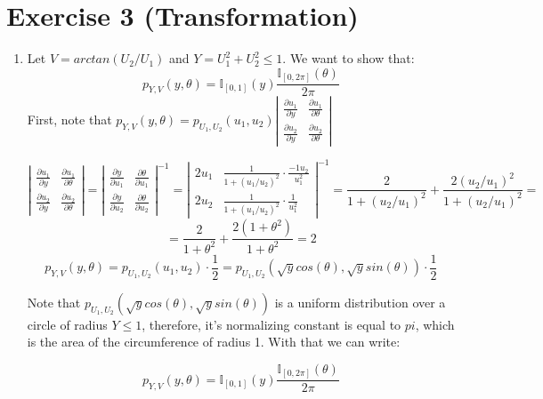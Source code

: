 \documentclass[12pt,letterpaper]{article}
\begin{document}
\section*{Exercise 3 (Transformation)}
\begin{enumerate}[leftmargin=!,labelindent=5pt]

	\item Let $V = arctan(U_2/U_1)$ and $Y = U_1^2 + U_2^2 \leq 1$.
	We want to show that:
	$$p_{Y,V}(y,\theta) =
	\mathbb{I}_{[0,1]}(y)\frac{\mathbb{I}_{[0,2\pi]}(\theta)}{2\pi}$$
	First, note that $p_{Y,V}(y,\theta) = p_{U_1,U_2}(u_1,u_2)
	\left|\begin{array}{ccc}
	\frac{\partial u_1}{\partial y} & \frac{\partial u_1}{\partial \theta}
	\\
	\frac{\partial u_2}{\partial y} & \frac{\partial u_2}{\partial \theta}
	\end{array}\right|$

	$$
	\left|\begin{array}{ccc}
	\frac{\partial u_1}{\partial y} & \frac{\partial u_1}{\partial \theta}
	\\
	\frac{\partial u_2}{\partial y} & \frac{\partial u_2}{\partial \theta}
	\end{array}\right| =
	\left|\begin{array}{ccc}
	\frac{\partial y}{\partial u_1} & \frac{\partial \theta}{\partial u_1}
	\\
	\frac{\partial y}{\partial u_2} & \frac{\partial \theta}{\partial u_2}
	\end{array}\right|^{-1} = 
	\left|\begin{array}{ccc}
	2u_1 & \frac{1}{1+(u_1/u_2)^2}\cdot \frac{-1u_2}{u_1^2}
	\\
	2u_2 & \frac{1}{1+(u_1/u_2)^2}\cdot \frac{1}{u_1^2}
	\end{array}\right|^{-1} = 
	\frac{2}{1+(u_2/u_1)^2} + \frac{2(u_2/u_1)^2}{1+(u_2/u_1)^2}=
	$$
	$$ = \frac{2}{1+\theta^2} + \frac{2(1+\theta^2)}{1+\theta^2} = 2$$
	$$
	p_{Y,V}(y,\theta) = p_{U_1,U_2}(u_1,u_2)\cdot\frac{1}{2} =
	p_{U_1,U_2}(\sqrt y cos(\theta), \sqrt y sin(\theta))\cdot\frac{1}{2}
	$$

	Note that $p_{U_1,U_2}(\sqrt y cos(\theta), \sqrt y sin(\theta))$
	is a uniform distribution over a circle of radius $Y \leq 1$, therefore, it's normalizing constant is equal to $pi$, which is the
	area of the circumference of radius 1. With that we can write:

	$$p_{Y,V}(y,\theta) =
	\mathbb{I}_{[0,1]}(y)\frac{\mathbb{I}_{[0,2\pi]}(\theta)}{2\pi}$$


\end{enumerate}
\end{document}
